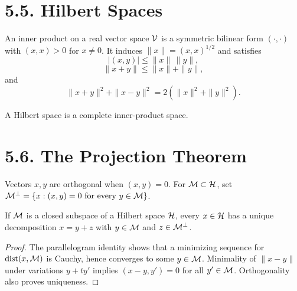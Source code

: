 \section*{5.5. Hilbert Spaces}

\begin{definition}\label{gt.def5.5.inner-product}

An inner product on a real vector space $\mathcal{V}$ is a symmetric bilinear form
$(\cdot,\cdot)$ with $(x,x)>0$ for $x\neq0$. It induces
$\|x\|=(x,x)^{1/2}$ and satisfies
\begin{equation}\label{gt.eq5.7}
|(x,y)|\leq\|x\|\,\|y\|,
\end{equation}
\begin{equation}\label{gt.eq5.8}
\|x+y\|\leq\|x\|+\|y\|,
\end{equation}
and
\begin{equation}\label{gt.eq5.9}
\|x+y\|^2+\|x-y\|^2=2(\|x\|^2+\|y\|^2).
\end{equation}
\end{definition}

\begin{definition}\label{gt.def5.5.hilbert-space}

A Hilbert space is a complete inner-product space.
\end{definition}

\section*{5.6. The Projection Theorem}

\begin{definition}\label{gt.def5.6.orthogonal}

Vectors $x,y$ are orthogonal when $(x,y)=0$. For $\mathcal{M}\subset\mathcal{H}$, set
$\mathcal{M}^\perp=\{x:(x,y)=0\text{ for every }y\in\mathcal{M}\}$.
\end{definition}

\begin{theorem}\label{gt.thm5.6}

If $\mathcal{M}$ is a closed subspace of a Hilbert space $\mathcal{H}$, every
$x\in\mathcal{H}$ has a unique decomposition $x=y+z$ with
$y\in\mathcal{M}$ and $z\in\mathcal{M}^\perp$.
\end{theorem}
\begin{proof}

\sketch The parallelogram identity shows that a minimizing sequence for
$\operatorname{dist}(x,\mathcal{M})$ is Cauchy, hence converges to some $y\in\mathcal{M}$. Minimality of
$\|x-y\|$ under variations $y+t y'$ implies $(x-y,y')=0$ for all
$y'\in\mathcal{M}$. Orthogonality also proves uniqueness.
\end{proof}

